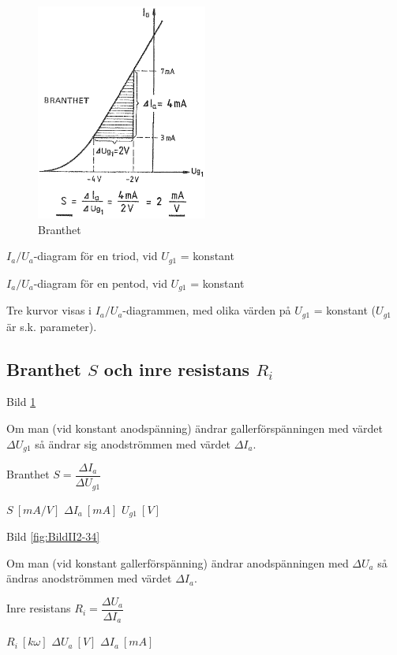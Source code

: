 \begin{figure}
\includegraphics[width=0.5\textwidth]{images/cropped_pdfs/bild_2_2-33.pdf}
\caption{Branthet}
\label{fig:BildII2-33}
\end{figure}

\(I_a/U_a\)-diagram för en triod, vid \(U_{g1}\) = konstant

\(I_a/U_a\)-diagram för en pentod, vid \(U_{g1}\) = konstant

Tre kurvor visas i \(I_a/U_a\)-diagrammen, med olika värden på
\(U_{g1}\) = konstant (\(U_{g1}\) är s.k. parameter).

\subsection{Branthet $S$ och inre resistans $R_i$}

Bild \ref{fig:BildII2-33}

Om man (vid konstant anodspänning) ändrar gallerförspänningen med värdet
\(\Delta U_{g1}\) så ändrar sig anodströmmen med värdet \(\Delta I_a\).

Branthet \(S = \dfrac{\Delta I_a}{\Delta U_{g1}}\)

\(S\ [mA/V]\) \(\Delta I_a\ [mA]\) \(U_{g1}\ [V]\)

Bild \ref{fig:BildII2-34}

Om man (vid konstant gallerförspänning) ändrar anodspänningen med
\(\Delta U_a\) så ändras anodströmmen med värdet \(\Delta I_a\).

Inre resistans \(R_i = \dfrac{\Delta U_a}{\Delta I_a}\)

\(R_i\ [k \omega]\)  \(\Delta U_a\ [V]\)  \(\Delta I_a\ [mA]\)

